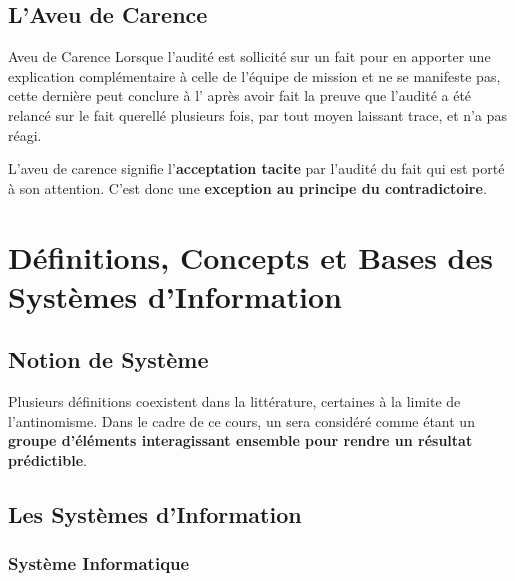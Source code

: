 \subsection{L'Aveu de Carence}

\begin{boxdef}{Aveu de Carence}
Lorsque l'audité est sollicité sur un fait pour en apporter une explication
complémentaire à celle de l'équipe de mission et ne se manifeste pas, cette dernière
peut conclure à l' après avoir fait la preuve que l'audité
a été relancé sur le fait querellé plusieurs fois, par tout moyen laissant trace, et n'a
pas réagi.

L'aveu de carence signifie l'\textbf{acceptation tacite} par l'audité du fait qui est
porté à son attention. C'est donc une \textbf{exception au principe du contradictoire}.
\end{boxdef}

\section{Définitions, Concepts et Bases des Systèmes d'Information}

\subsection{Notion de Système}

Plusieurs définitions coexistent dans la littérature, certaines à la limite de
l'antinomisme. Dans le cadre de ce cours, un  sera considéré comme
étant un \textbf{groupe d'éléments interagissant ensemble pour rendre un résultat
prédictible}.

\subsection{Les Systèmes d'Information}

\subsubsection{Système Informatique}

